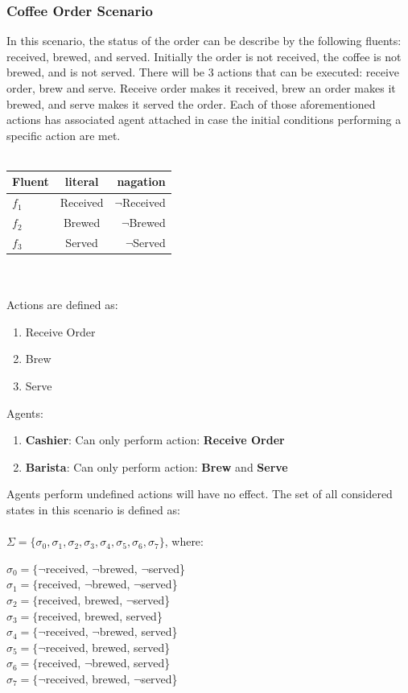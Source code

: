 \documentclass[a4paper]{article}
\begin{document}
\subsubsection{Coffee Order Scenario}
In this scenario, the status of the order can be describe by the following fluents: received, brewed, and served. 
Initially the order is not received, the coffee is not brewed, and is not served. 
There will be 3 actions that can be executed: receive order, brew and serve. 
Receive order makes it received, brew an order makes it brewed, and serve makes it served the order. 
Each of those aforementioned actions has associated agent attached in case the initial conditions performing a specific action are met.
\\\\
\begin{tabular}{|l|c|r|}
\hline
\textbf{Fluent} & \textbf{literal} & \textbf{nagation} \\ \hline
$f_1$ & Received & $\neg$Received \\
$f_2$ & Brewed & $\neg$Brewed \\
$f_3$ & Served & $\neg$Served \\ \hline
\end{tabular} \\\\
Actions are defined as:
\begin{enumerate}
  \item Receive Order
  \item Brew
  \item Serve
\end{enumerate}
Agents:
\begin{enumerate}
  \item \textbf{Cashier}: Can only perform action: \textbf{Receive Order}
  \item \textbf{Barista}: Can only perform action: \textbf{Brew} and \textbf{Serve}
\end{enumerate}
Agents perform undefined actions will have no effect.
The set of all considered states in this scenario is defined as: \\\\
$\Sigma = \{{\sigma_0, \sigma_1, \sigma_2, \sigma_3, \sigma_4, \sigma_5, \sigma_6, \sigma_7\}}$, where:
\begin{center}
$\sigma_0 = \{${$\neg$received, $\neg$brewed, $\neg$served}\} \\[0.1\baselineskip]
$\sigma_1 = \{${received, $\neg$brewed, $\neg$served}\} \\[0.1\baselineskip]
$\sigma_2 = \{${received, brewed, $\neg$served}\} \\[0.1\baselineskip]
$\sigma_3 = \{${received, brewed, served}\} \\[0.1\baselineskip]
$\sigma_4 = \{${$\neg$received, $\neg$brewed, served}\} \\[0.1\baselineskip]
$\sigma_5 = \{${$\neg$received, brewed, served}\} \\[0.1\baselineskip]
$\sigma_6 = \{${received, $\neg$brewed, served}\} \\[0.1\baselineskip]
$\sigma_7 = \{${$\neg$received, brewed, $\neg$served}\} \\[0.1\baselineskip]
\end{center}
\end{document}
